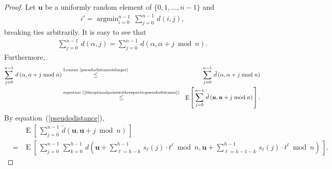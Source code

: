 \documentclass[letterpaper,12pt]{article}
\newcommand\bs[1]{\boldsymbol{#1}}
\begin{document}
\begin{proof}
Let $\bs{u}$
be
a
uniformly random
element
of $\{0,1,\ldots,n-1\}$ and
\begin{eqnarray}
i'=\mathop{\mathrm{argmin}}_{i=0}^{n-1}\, \sum_{j=0}^{n-1}\,
d\left(i,j\right),
\label{startofequations}
\end{eqnarray}
breaking ties arbitrarily.
It is easy to see that
\begin{eqnarray}
\sum_{j=0}^{n-1}\, d\left(\alpha,j\right)
=\sum_{j=0}^{n-1}\, d\left(\alpha,\alpha+j\bmod{n}\right).
\nonumber
\end{eqnarray}
Furthermore,
\begin{eqnarray}
\sum_{j=0}^{n-1}\, d\left(\alpha,\alpha+j\bmod{n}\right)
\nonumber
&\stackrel{\text{Lemma~\ref{pseudodistanceislarger}}}{\le}&
\sum_{j=0}^{n-1}\,
\tilde{d}\left(\alpha,\alpha+j\bmod{n}\right)
\nonumber\\
&\stackrel{\text{equation~(\ref{theoptimalpointwithrespecttopseudodistance})}}{\le}&
\mathop{\mathrm E}\left[\,
\sum_{j=0}^{n-1}\,
\tilde{d}\left(\bs{u},\bs{u}+j\bmod{n}\right)
\,\right].
\nonumber
\end{eqnarray}
By equation~(\ref{pseudodistance}),
\begin{eqnarray}
&&
\mathop{\mathrm E}\left[\,
\sum_{j=0}^{n-1}\,
\tilde{d}\left(\bs{u},\bs{u}+j\bmod{n}
\right)\,\right]
\nonumber\\
&=&
\mathop{\mathrm E}\left[\,
\sum_{j=0}^{n-1}\,
\sum_{k=0}^{h-1}\, d\left(\bs{u}+\sum_{\ell=h-k}^{h-1}\, s_\ell(j)
\cdot t^\ell\bmod{n},
\bs{u}+\sum_{\ell=h-1-k}^{h-1}\, s_\ell(j)\cdot t^\ell\bmod{n}\right)
\,\right].
\nonumber
\end{eqnarray}


\end{proof}
\end{document}
